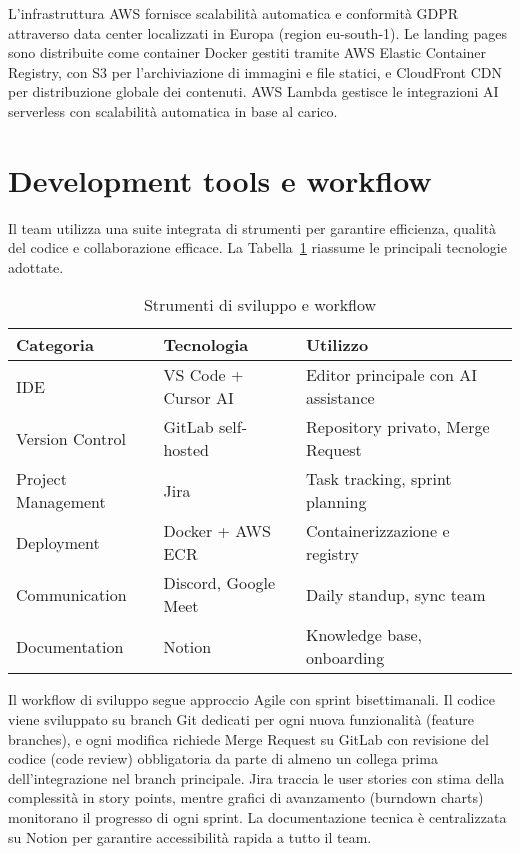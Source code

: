 L'infrastruttura AWS fornisce scalabilità automatica e conformità GDPR 
attraverso data center localizzati in Europa (region eu-south-1). Le landing 
pages sono distribuite come container Docker gestiti tramite AWS Elastic 
Container Registry, con S3 per l'archiviazione di immagini e file statici, e 
CloudFront CDN per distribuzione globale dei contenuti. AWS Lambda gestisce le 
integrazioni AI serverless con scalabilità automatica in base al carico.

\section{Development tools e workflow}

Il team utilizza una suite integrata di strumenti per garantire efficienza, 
qualità del codice e collaborazione efficace. La Tabella~\ref{tab:dev-tools} 
riassume le principali tecnologie adottate.

\begin{table}[h]
\centering
\caption{Strumenti di sviluppo e workflow}
\label{tab:dev-tools}
\begin{tabular}{|l|l|p{6cm}|}
\hline
\textbf{Categoria} & \textbf{Tecnologia} & \textbf{Utilizzo} \\
\hline
IDE & VS Code + Cursor AI & Editor principale con AI assistance \\
\hline
Version Control & GitLab self-hosted & Repository privato, Merge Request \\
\hline
Project Management & Jira & Task tracking, sprint planning \\
\hline
Deployment & Docker + AWS ECR & Containerizzazione e registry \\
\hline
Communication & Discord, Google Meet & Daily standup, sync team \\
\hline
Documentation & Notion & Knowledge base, onboarding \\
\hline
\end{tabular}
\end{table}

Il workflow di sviluppo segue approccio Agile con sprint bisettimanali. Il 
codice viene sviluppato su branch Git dedicati per ogni nuova funzionalità 
(feature branches), e ogni modifica richiede Merge Request su GitLab con 
revisione del codice (code review) obbligatoria da parte di almeno un 
collega prima dell'integrazione nel branch principale. Jira traccia le user 
stories con stima della complessità in story points, mentre grafici di 
avanzamento (burndown charts) monitorano il progresso di ogni sprint. La 
documentazione tecnica è centralizzata su Notion per garantire accessibilità 
rapida a tutto il team.